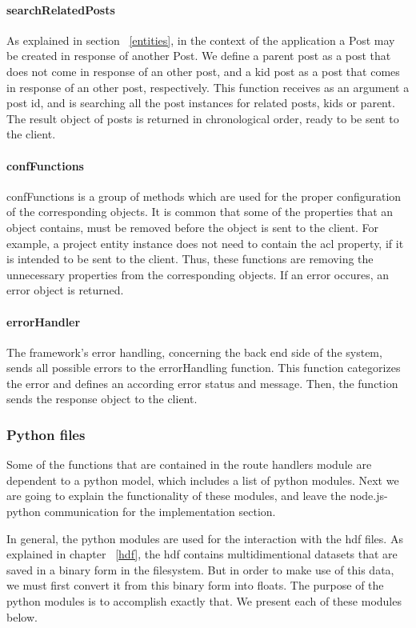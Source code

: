 \paragraph{searchRelatedPosts}
As explained in section ~\ref{entities}, in the context of the application a Post may be created in response of another Post. We define a parent post as a post that does not come in response of an other post, and a kid post as a post that comes in response of an other post, respectively. This function receives as an argument a post id, and is searching all the post instances for related posts, kids or parent. The result object of posts is returned in chronological order, ready to be sent to the client.

\paragraph{confFunctions}
confFunctions is a group of methods which are used for the proper configuration of the corresponding objects. It is common that some of the properties that an object contains, must be removed before the object is sent to the client. For example, a project entity instance does not need to contain the acl property, if it is intended to be sent to the client. Thus, these functions are removing the unnecessary properties from the corresponding objects. If an error occures, an error object is returned.

\paragraph{errorHandler}
	The framework's error handling, concerning the back end side of the system, sends all possible errors to the errorHandling function. This function categorizes the error and defines an according error status and message. Then, the function sends the response object to the client.
	
\subsubsection{Python files}
\label{pyfiles}
Some of the functions that are contained in the route handlers module are dependent to a python model, which includes a list of python modules. Next we are going to explain the functionality of these modules, and leave the node.js- python communication for the implementation section. \par 
	In general, the python modules are used for the interaction with the hdf files. As explained in chapter ~\ref{hdf}, the hdf contains multidimentional datasets that are saved in a binary form in the filesystem. But in order to make use of this data, we must first convert it from this binary form into floats. The purpose of the python modules is to accomplish exactly that. We present each of these modules below.
	
